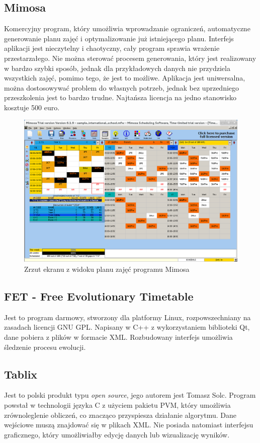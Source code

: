 \subsection{Mimosa}
Komercyjny program, który umożliwia wprowadzanie ograniczeń, automatyczne generowanie planu zajęć i optymalizowanie już istniejącego planu. Interfejs aplikacji jest nieczytelny i chaotyczny, cały program sprawia wrażenie przestarzałego. Nie można sterować procesem generowania, który jest realizowany w bardzo szybki sposób, jednak dla przykładowych danych nie przydziela wszystkich zajęć, pomimo tego, że jest to możliwe. Aplikacja jest uniwersalna, można dostosowywać problem do własnych potrzeb, jednak bez uprzedniego przeszkolenia jest to bardzo trudne. Najtańsza licencja na jedno stanowisko kosztuje 500 euro.
\begin{figure}[H]
\includegraphics[width=15cm]{img/mimosa.png}
\caption{Zrzut ekranu z widoku planu zajęć programu Mimosa}
\end{figure}
\subsection{FET - Free Evolutionary Timetable}
Jest to program darmowy, stworzony dla platformy Linux, rozpowszechniany na zasadach licencji GNU GPL. Napisany w C++ z wykorzystaniem biblioteki Qt, dane pobiera z plików w formacie XML. Rozbudowany interfejs umożliwia śledzenie procesu ewolucji.
\subsection{Tablix}
Jest to polski produkt typu \emph{open source}, jego autorem jest Tomasz Solc. Program powstał w technologii języka C z użyciem pakietu PVM, który umożliwia zrównoleglenie obliczeń, co znacząco przyspiesza działanie algorytmu. Dane wejściowe muszą znajdować się w plikach XML. Nie posiada natomiast interfejsu graficznego, który umożliwiałby edycję danych lub wizualizację wyników.
